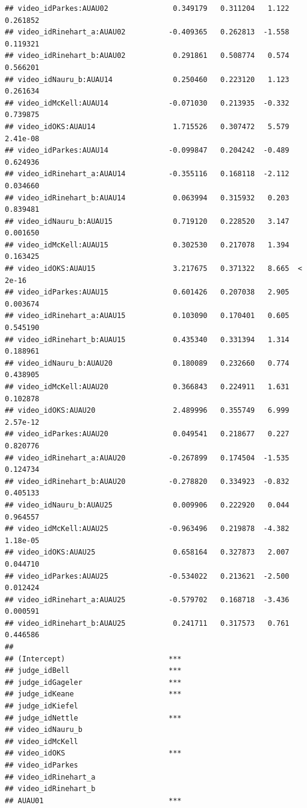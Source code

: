 \documentclass{monashthesis}
\begin{document}
\begin{verbatim}
## video_idParkes:AUAU02               0.349179   0.311204   1.122 0.261852
## video_idRinehart_a:AUAU02          -0.409365   0.262813  -1.558 0.119321
## video_idRinehart_b:AUAU02           0.291861   0.508774   0.574 0.566201
## video_idNauru_b:AUAU14              0.250460   0.223120   1.123 0.261634
## video_idMcKell:AUAU14              -0.071030   0.213935  -0.332 0.739875
## video_idOKS:AUAU14                  1.715526   0.307472   5.579 2.41e-08
## video_idParkes:AUAU14              -0.099847   0.204242  -0.489 0.624936
## video_idRinehart_a:AUAU14          -0.355116   0.168118  -2.112 0.034660
## video_idRinehart_b:AUAU14           0.063994   0.315932   0.203 0.839481
## video_idNauru_b:AUAU15              0.719120   0.228520   3.147 0.001650
## video_idMcKell:AUAU15               0.302530   0.217078   1.394 0.163425
## video_idOKS:AUAU15                  3.217675   0.371322   8.665  < 2e-16
## video_idParkes:AUAU15               0.601426   0.207038   2.905 0.003674
## video_idRinehart_a:AUAU15           0.103090   0.170401   0.605 0.545190
## video_idRinehart_b:AUAU15           0.435340   0.331394   1.314 0.188961
## video_idNauru_b:AUAU20              0.180089   0.232660   0.774 0.438905
## video_idMcKell:AUAU20               0.366843   0.224911   1.631 0.102878
## video_idOKS:AUAU20                  2.489996   0.355749   6.999 2.57e-12
## video_idParkes:AUAU20               0.049541   0.218677   0.227 0.820776
## video_idRinehart_a:AUAU20          -0.267899   0.174504  -1.535 0.124734
## video_idRinehart_b:AUAU20          -0.278820   0.334923  -0.832 0.405133
## video_idNauru_b:AUAU25              0.009906   0.222920   0.044 0.964557
## video_idMcKell:AUAU25              -0.963496   0.219878  -4.382 1.18e-05
## video_idOKS:AUAU25                  0.658164   0.327873   2.007 0.044710
## video_idParkes:AUAU25              -0.534022   0.213621  -2.500 0.012424
## video_idRinehart_a:AUAU25          -0.579702   0.168718  -3.436 0.000591
## video_idRinehart_b:AUAU25           0.241711   0.317573   0.761 0.446586
##                                       
## (Intercept)                        ***
## judge_idBell                       ***
## judge_idGageler                    ***
## judge_idKeane                      ***
## judge_idKiefel                        
## judge_idNettle                     ***
## video_idNauru_b                       
## video_idMcKell                        
## video_idOKS                        ***
## video_idParkes                        
## video_idRinehart_a                    
## video_idRinehart_b                    
## AUAU01                             ***

\end{verbatim}
\end{document}
